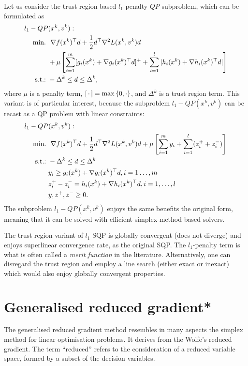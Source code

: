 Let us consider the trust-region based $l_1$-penalty $QP$ subproblem, which can be formulated as
%
\begin{align*}
l_1-QP&(x^k, v^k) :\\
\mathop{\text{min.~}} & \ \nabla f(x^k)^\top d + \frac{1}{2}d^\top\nabla^2L(x^k,v^k)d \\ & + \mu\left[ \sum_{i=1}^m [g_i(x^k) + \nabla g_i(x^k)^\top d]^+  + \sum_{i=1}^l |h_i(x^k) + \nabla h_i(x^k)^\top d| \right] \\
 \mathop{\text{s.t.:~}} & -\Delta^k \leq d \leq \Delta^k,  
\end{align*}
where $\mu$ is a penalty term, $[\, \cdot \,] = \max\left\{ 0, \cdot \right \}$, and $\Delta^k$ is a trust region term. This variant is of particular interest, because the subproblem $l_1-QP(x^k, v^k) $ can be recast as a QP problem with linear constraints:
%
\begin{align*}
l_1-QP&(x^k, v^k) :\\
\mathop{\text{min.~}} & \ \nabla f(x^k)^\top d + \frac{1}{2}d^\top\nabla^2L(x^k,v^k)d  + \mu\left[ \sum_{i=1}^m y_i  + \sum_{i=1}^l (z^+_i + z^-_i) \right]\\
 \mathop{\text{s.t.:~}} & -\Delta^k \leq d \leq \Delta^k\\
 & y_i \geq g_i(x^k) + \nabla g_i(x^k)^\top d, i = 1\dots, m\\
 & z^+_i - z^-_i = h_i(x^k) + \nabla h_i(x^k)^\top d, i = 1,\dots,l \\ 
 &y, z^+, z^- \geq 0.   
\end{align*}
%
The subproblem $l_1-QP(x^k, v^k)$ enjoys the same benefits the original form, meaning that it can be solved with efficient simplex-method based solvers. 

The trust-region variant of $l_1$-SQP is globally convergent (does not diverge) and enjoys superlinear convergence rate, as the original SQP. The $l_1$-penalty term is what is often called a \emph{merit function} in the literature. Alternatively, one can disregard the trust region and employ a line search (either exact or inexact) which would also enjoy globally convergent properties.  


\section{Generalised reduced gradient*}


The generalised reduced gradient method resembles in many aspects the simplex method for linear optimisation problems. It derives from the Wolfe's reduced gradient. The term ``reduced'' refers to the consideration of a reduced variable space, formed by a subset of the decision variables.

